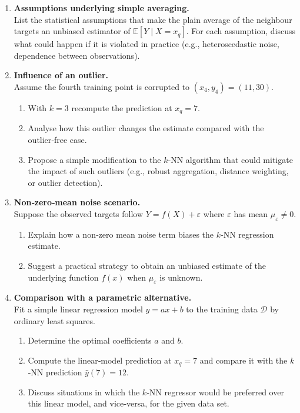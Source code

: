 \documentclass[12pt, a4paper]{article}
\begin{document}
\begin{enumerate}
  \item \textbf{Assumptions underlying simple averaging.}\\
  List the statistical assumptions that make the plain average of the
  neighbour targets an unbiased estimator of \(\mathbb{E}[Y\mid X=x_q]\).
  For each assumption, discuss what could happen if it is violated in practice
  (e.g., heteroscedastic noise, dependence between observations).

  \item \textbf{Influence of an outlier.}\\
  Assume the fourth training point is corrupted to \((x_4,y_4)=(11,30)\).
  \begin{enumerate}
    \item With \(k=3\) recompute the prediction at \(x_q=7\).
    \item Analyse how this outlier changes the estimate compared with the
          outlier‑free case.
    \item Propose a simple modification to the $k$‑NN algorithm that could
          mitigate the impact of such outliers (e.g., robust aggregation,
          distance weighting, or outlier detection).
  \end{enumerate}

  \item \textbf{Non‑zero‑mean noise scenario.}\\
  Suppose the observed targets follow \(Y = f(X) + \varepsilon\) where
  \(\varepsilon\) has mean \(\mu_{\varepsilon}\neq 0\).
  \begin{enumerate}
    \item Explain how a non‑zero mean noise term biases the $k$‑NN regression
          estimate.
    \item Suggest a practical strategy to obtain an unbiased estimate of the
          underlying function \(f(x)\) when \(\mu_{\varepsilon}\) is unknown.
  \end{enumerate}

  \item \textbf{Comparison with a parametric alternative.}\\
  Fit a simple linear regression model \(y = a x + b\) to the training data
  \(\mathcal{D}\) by ordinary least squares.
  \begin{enumerate}
    \item Determine the optimal coefficients \(a\) and \(b\).
    \item Compute the linear‑model prediction at \(x_q=7\) and compare it with
          the $k$‑NN prediction \(\hat y(7)=12\).
    \item Discuss situations in which the $k$‑NN regressor would be preferred
          over this linear model, and vice‑versa, for the given data set.
  \end{enumerate}


\end{enumerate}
\end{document}
